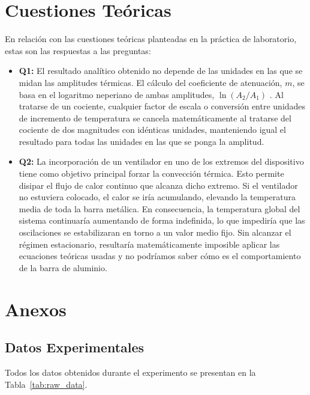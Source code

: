 \documentclass[a4paper,11pt]{article}
\begin{document}
\section{Cuestiones Teóricas}

En relación con las cuestiones teóricas planteadas en la práctica de laboratorio, estas son las respuestas a las preguntas:
\begin{itemize}
    \item \textbf{Q1:} El resultado analítico obtenido no depende de las unidades en las que se midan las amplitudes térmicas. El cálculo del coeficiente de atenuación, $m$, se basa en el logaritmo neperiano de ambas amplitudes, $\ln(A_2/A_1)$ \cite{guiones_pract}. Al tratarse de un cociente, cualquier factor de escala o conversión entre unidades de incremento de temperatura se cancela matemáticamente al tratarse del cociente de dos magnitudes con idénticas unidades, manteniendo igual el resultado para todas las unidades en las que se ponga la amplitud.
    
    \item \textbf{Q2:} La incorporación de un ventilador en uno de los extremos del dispositivo tiene como objetivo principal forzar la convección térmica. Esto permite disipar el flujo de calor continuo que alcanza dicho extremo. Si el ventilador no estuviera colocado, el calor se iría acumulando, elevando la temperatura media de toda la barra metálica. En consecuencia, la temperatura global del sistema continuaría aumentando de forma indefinida, lo que impediría que las oscilaciones se estabilizaran en torno a un valor medio fijo. Sin alcanzar el régimen estacionario, resultaría matemáticamente imposible aplicar las ecuaciones teóricas usadas y no podríamos saber cómo es el comportamiento de la barra de aluminio.
\end{itemize}

\section{Anexos}

\subsection{Datos Experimentales}
Todos los datos obtenidos durante el experimento se presentan en la Tabla~\ref{tab:raw_data}.
\end{document}
